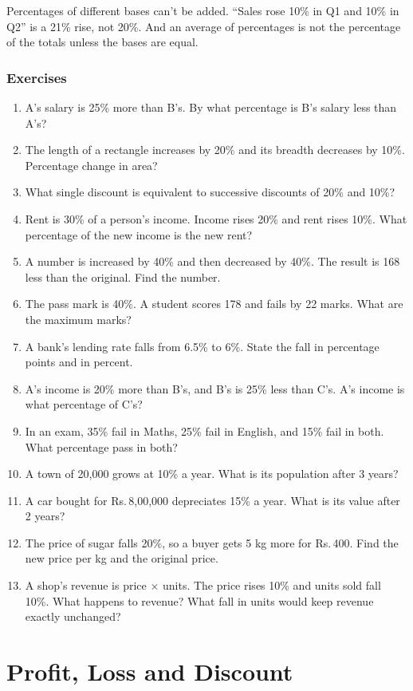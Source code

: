 \documentclass[11pt,a4paper,openany]{report}
\newenvironment{exercises}{\subsection*{Exercises \thechapter}\begin{enumerate}[label=\textbf{\thechapter.\arabic*},leftmargin=3.2em]}{\end{enumerate}}
\newcommand{\Rs}{Rs.\,}
\begin{document}
\begin{trap}
Percentages of different bases can't be added. ``Sales rose 10\% in Q1 and 10\% in Q2'' is a 21\% rise, not 20\%.
And an average of percentages is not the percentage of the totals unless the bases are equal.
\end{trap}

\begin{exercises}
\item A's salary is 25\% more than B's. By what percentage is B's salary less than A's?
\item The length of a rectangle increases by 20\% and its breadth decreases by 10\%. Percentage change in area?
\item What single discount is equivalent to successive discounts of 20\% and 10\%?
\item Rent is 30\% of a person's income. Income rises 20\% and rent rises 10\%. What percentage of the new income is the new rent?
\item A number is increased by 40\% and then decreased by 40\%. The result is 168 less than the original. Find the number.
\item The pass mark is 40\%. A student scores 178 and fails by 22 marks. What are the maximum marks?
\item A bank's lending rate falls from 6.5\% to 6\%. State the fall in percentage points and in percent.
\item A's income is 20\% more than B's, and B's is 25\% less than C's. A's income is what percentage of C's?
\item In an exam, 35\% fail in Maths, 25\% fail in English, and 15\% fail in both. What percentage pass in both?
\item A town of 20,000 grows at 10\% a year. What is its population after 3 years?
\item A car bought for \Rs8,00,000 depreciates 15\% a year. What is its value after 2 years?
\item The price of sugar falls 20\%, so a buyer gets 5 kg more for \Rs400. Find the new price per kg and the original price.
\item A shop's revenue is price $\times$ units. The price rises 10\% and units sold fall 10\%. What happens to revenue? What fall in units would keep revenue exactly unchanged?
\end{exercises}

\chapter{Profit, Loss and Discount}\label{ch:pl}
\end{document}
